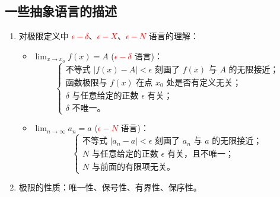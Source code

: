 \documentclass[a4paper,12pt]{ctexart}
\begin{document}
\subsection{一些抽象语言的描述}
\begin{enumerate}
    \item 对极限定义中 \textcolor{red}{$\epsilon - \delta$}、\textcolor{red}{$\epsilon - X$}、\textcolor{red}{$\epsilon - N$} 语言的理解：
    \begin{itemize}
        \item $\lim_{x \to x_0} f(x) = A$ (\textcolor{red}{$\epsilon - \delta$} 语言)：
        \[
        \begin{cases}
        \text{不等式 } |f(x) - A| < \epsilon \text{ 刻画了 } f(x) \text{ 与 } A \text{ 的无限接近；} \\
        \text{函数极限与 } f(x) \text{ 在点 } x_0 \text{ 处是否有定义无关；} \\
        \delta \text{ 与任意给定的正数 } \epsilon \text{ 有关；} \\
        \delta \text{ 不唯一。}
        \end{cases}
        \]
        \item $\lim_{n \to \infty} a_n = a$ (\textcolor{red}{$\epsilon - N$} 语言)：
        \[
        \begin{cases}
        \text{不等式 } |a_n - a| < \epsilon \text{ 刻画了 } a_n \text{ 与 } a \text{ 的无限接近；} \\
        N \text{ 与任意给定的正数 } \epsilon \text{ 有关，且不唯一；} \\
        N \text{ 与前面的有限项无关。}
        \end{cases}
        \]
    \end{itemize}
    \item 极限的性质：唯一性、保号性、有界性、保序性。
\end{enumerate}
\end{document}
